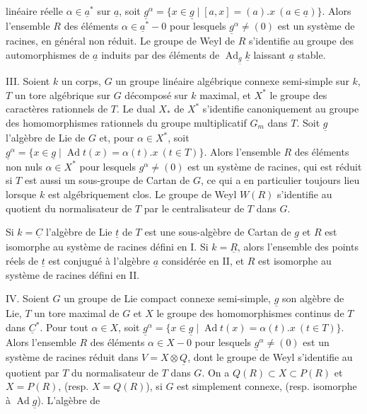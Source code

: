 linéaire réelle $\alpha\in\underline{a}^*$ sur $\underline{a}$, soit
$\underline{g}^\alpha=\{x\in\underline{g}\mid[a,x]=(a).x\ (a\in\underline{a})\}$.
Alors l'ensemble $R$ des éléments $\alpha\in\underline{a}^*-0$ pour lesquels
$\underline{g}^\alpha\ne(0)$ est un système de racines, en général non réduit.
Le groupe de Weyl de $R$ s'identifie au groupe des automorphismes de $\underline{a}$ induits par des éléments de $\operatorname{Ad}_{\underline{g}}\underline{k}$ laissant $\underline{a}$ stable.

III. Soient $k$ un corps, $G$ un groupe linéaire algébrique connexe semi-simple sur $k$, $T$ un tore algébrique sur $G$ décomposé sur $k$ maximal, et $X^*$ le groupe des caractères rationnels de $T$.
Le dual $X_*$ de $X^*$ s'identifie canoniquement au groupe des homomorphismes rationnels du groupe multiplicatif $G_m$ dans $T$.
Soit $\underline{g}$ l'algèbre de Lie de $G$ et, pour $\alpha\in X^*$, soit
$\underline{g}^\alpha=\{x\in\underline{g}\mid\operatorname{Ad}t(x)=\alpha(t).x\ (t\in T)\}$.
Alors l'ensemble $R$ des éléments non nuls $\alpha\in X^*$ pour lesquels $g^\alpha\ne(0)$ est un système de racines, qui est réduit si $T$ est aussi un sous-groupe de Cartan de $G$, ce qui a en particulier toujours lieu lorsque $k$ est algébriquement clos.
Le groupe de Weyl $W(R)$ s'identifie au quotient du normalisateur de $T$ par le centralisateur de $T$ dans $G$.

Si $k=\underline{C}$ l'algèbre de Lie $\underline{t}$ de $T$ est une sous-algèbre de Cartan de $\underline{g}$ et $R$ est isomorphe au système de racines défini en I.
Si $k=\underline{R}$, alors l'ensemble des points réels de $\underline{t}$ est conjugué à l'algèbre $\underline{a}$ considérée en II, et $R$ est isomorphe au système de racines défini en II.

IV. Soient $G$ un groupe de Lie compact connexe semi-simple, $\underline{g}$ son algèbre de Lie, $T$ un tore maximal de $G$ et $X$ le groupe des homomorphismes continus de $T$ dans $\underline{C}^*$.
Pour tout $\alpha\in X$, soit $\underline{g}^\alpha=\{x\in\underline{g}\mid\operatorname{Ad}t(x)=\alpha(t).x\ (t\in T)\}$.
Alors l'ensemble $R$ des éléments $\alpha\in X-0$ pour lesquels $\underline{g}^\alpha\ne(0)$ est un système de racines réduit dans $V=X\otimes\underline{Q}$, dont le groupe de Weyl s'identifie au quotient par $T$ du normalisateur de $T$ dans $G$.
On a $Q(R)\subset X\subset P(R)$ et $X=P(R)$, (resp. $X=Q(R)$), si $G$ est simplement connexe, (resp. isomorphe à $\operatorname{Ad}\underline{g}$). L'algèbre de

